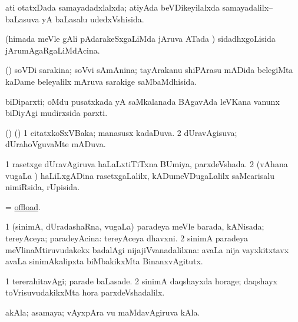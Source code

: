 \bentry
{}
\gl{\gu}
\bmng
ati otatxDada samayadadxlalxda; atiyAda beVDikeyilalxda samayadalilx--baLasuva yA baLasalu udedxVshisida. 
\emng
\eentry

\bentry
{}
\gl{\gu}
\bmng
(himada meVle gAli pAdarakeSxgaLiMda jAruva ATada \vi) sidadhxgoLisida jArumAgaRgaLiMdAcina. 
\emng
\eentry

\bentry
{}
\gl{\gu}
\bmng
(\ame) soVDi sarakina; soVvi sAmAnina; tayArakanu shiPArasu mADida belegiMta kaDame beleyalilx mAruva sarakige saMbaMdhisida. 
\emng
\eentry

\bentry
{}
\gl{\nA}
\bmng
biDiparxti; oMdu pusatxkada yA saMkalanada BAgavAda leVKana \mo vanunx biDiyAgi mudirxsida parxti. 
\emng
\eentry

\bentry
{}
\gl{\gu}
\bmng
(\birx) (\AmA) 
\bnum
\num{1} citatxkoSxVBaka; manasusx kadaDuva. 
\num{2} dUravAgisuva; dUrahoVguvaMte mADuva. 
\enum
\emng
\eentry

\bentry
{}
\gl{\gu}
\bmng
\bnum
\num{1} rasetxge dUravAgiruva haLaLxtiTiTxna BUmiya, parxdeVshada. 
\num{2} (vAhana \mo vugaLa \vi) haLiLxgADina rasetxgaLalilx, kADumeVDugaLalilx saMcarisalu nimiRsida, rUpisida. 
\enum
\emng
\eentry

\bentry
{}
\gl{\sakirx}
\bmng
= \hyperlink{offload}{offload}. 
\emng
\eentry

\bentry
{}
\gl{\gu}
\bmng
\bnum
\num{1} (sinimA, dUradashaRna, \mo vugaLa) paradeya meVle barada, kANisada; tereyAceya; paradeyAcina:  tereyAceya dhavxni. 
\num{2} sinimA paradeya meVlinaMtiruvudakekx badalAgi nijajiVvanadalilxna:  avaLa nija vayxkitxtavx avaLa sinimAkalipxta biMbakikxMta BinanxvAgitutx. 
\enum
\emng
\eentry

\bentry
{}
\gl{\kirxvi}
\bmng
\bnum
\num{1} tererahitavAgi; parade baLasade. 
\num{2} sinimA daqshayxda horage; daqshayx toVrisuvudakikxMta hora parxdeVshadalilx. 
\enum
\emng
\eentry

\bentry
{}
\gl{\nA}
\bmng
akAla; asamaya; vAyxpAra \mo vu maMdavAgiruva kAla. 
\emng
\eentry

